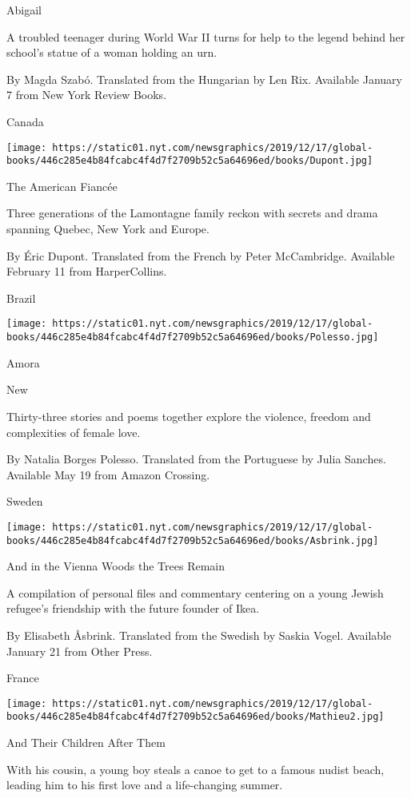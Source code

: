 Abigail

A troubled teenager during World War II turns for help to the legend
behind her school's statue of a woman holding an urn.

 By Magda Szabó. Translated from the Hungarian by Len Rix. Available
January 7 from New York Review Books.

Canada

\texttt{[image: https://static01.nyt.com/newsgraphics/2019/12/17/global-books/446c285e4b84fcabc4f4d7f2709b52c5a64696ed/books/Dupont.jpg]}

The American Fiancée

Three generations of the Lamontagne family reckon with secrets and drama
spanning Quebec, New York and Europe.

 By Éric Dupont. Translated from the French by Peter McCambridge.
Available February 11 from HarperCollins.

Brazil

\texttt{[image: https://static01.nyt.com/newsgraphics/2019/12/17/global-books/446c285e4b84fcabc4f4d7f2709b52c5a64696ed/books/Polesso.jpg]}

Amora

New

Thirty-three stories and poems together explore the violence, freedom
and complexities of female love.

 By Natalia Borges Polesso. Translated from the Portuguese by Julia
Sanches. Available May 19 from Amazon Crossing.

Sweden

\texttt{[image: https://static01.nyt.com/newsgraphics/2019/12/17/global-books/446c285e4b84fcabc4f4d7f2709b52c5a64696ed/books/Asbrink.jpg]}

And in the Vienna Woods the Trees Remain

A compilation of personal files and commentary centering on a young
Jewish refugee's friendship with the future founder of Ikea.

 By Elisabeth Åsbrink. Translated from the Swedish by Saskia Vogel.
Available January 21 from Other Press.

France

\texttt{[image: https://static01.nyt.com/newsgraphics/2019/12/17/global-books/446c285e4b84fcabc4f4d7f2709b52c5a64696ed/books/Mathieu2.jpg]}

And Their Children After Them

With his cousin, a young boy steals a canoe to get to a famous nudist
beach, leading him to his first love and a life-changing summer.


